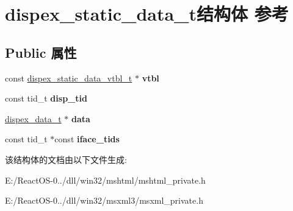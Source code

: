 \hypertarget{structdispex__static__data__t}{}\section{dispex\+\_\+static\+\_\+data\+\_\+t结构体 参考}
\label{structdispex__static__data__t}
\subsection*{Public 属性}
\begin{DoxyCompactItemize}
\item 
\mbox{\label{structdispex__static__data__t_afa1a7194751ca6e6bd83767edadac41c}} 
const \hyperlink{structdispex__static__data__vtbl__t}{dispex\+\_\+static\+\_\+data\+\_\+vtbl\+\_\+t} $\ast$ {\bfseries vtbl}
\item 
\mbox{\label{structdispex__static__data__t_a737aeb22edb2d53f0e9540801038f746}} 
const tid\+\_\+t {\bfseries disp\+\_\+tid}
\item 
\mbox{\label{structdispex__static__data__t_a644ead33b95a23cb670c3212265eca54}} 
\hyperlink{structdispex__data__t}{dispex\+\_\+data\+\_\+t} $\ast$ {\bfseries data}
\item 
\mbox{\label{structdispex__static__data__t_ad2a0d3b7bb8a42b3682a12b2025a7019}} 
const tid\+\_\+t $\ast$const {\bfseries iface\+\_\+tids}
\end{DoxyCompactItemize}


该结构体的文档由以下文件生成\+:\begin{DoxyCompactItemize}
\item 
E\+:/\+React\+O\+S-\/0../dll/win32/mshtml/mshtml\+\_\+private.\+h\item 
E\+:/\+React\+O\+S-\/0../dll/win32/msxml3/msxml\+\_\+private.\+h\end{DoxyCompactItemize}
